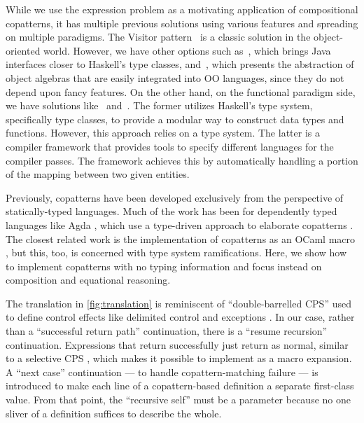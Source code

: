 While we use the expression problem as a motivating application of compositional copatterns, it has multiple previous solutions using various features and spreading on multiple paradigms.
The Visitor pattern~\cite{GangOfFour} is a classic solution in the object-oriented world.
However, we have other options such as~\cite{wehr_javagi_2011}, which brings Java interfaces closer to Haskell's type classes, and~\cite{hutchison_extensibility_2012}, which presents the abstraction of object algebras that are easily integrated into OO languages, since they do not depend upon fancy features.
On the other hand, on the functional paradigm side, we have solutions like~\cite{swierstra_data_2008} and~\cite{keep_nanopass_2013}.
The former utilizes Haskell's type system, specifically type classes, to provide a modular way to construct data types and functions.
However, this approach relies on a type system.
The latter is a compiler framework that provides tools to specify different languages for the compiler passes. The framework achieves this by automatically handling a portion of the mapping between two given entities.

Previously, copatterns have been developed exclusively from the perspective of statically-typed languages.
Much of the work has been for dependently typed languages like Agda \cite{ElaboratingDependentCopatterns}, which use a type-driven approach to elaborate copatterns \cite{UnnestingCopatterns,ThibodeauMasters}.
The closest related work is the implementation of copatterns as an OCaml macro \cite{LaforgueR17}, but this, too, is concerned with type system ramifications.
Here, we show how to implement copatterns with no typing information and focus instead on composition and equational reasoning.

The translation in \cref{fig:translation} is reminiscent of ``double-barrelled CPS'' \cite{DoubleBarrelCPS} used to define control effects like delimited control \cite{AbstractingControl} and exceptions \cite{KimYiDanvy98}.
In our case, rather than a ``successful return path'' continuation, there is a ``resume recursion'' continuation.
Expressions that return successfully just return as normal, similar to a selective CPS \cite{SelectiveCPS}, which makes it possible to implement as a macro expansion.
A ``next case'' continuation --- to handle copattern-matching failure --- is introduced to make each line of a copattern-based definition a separate first-class value.
From that point, the ``recursive self'' must be a parameter because no one sliver of a definition suffices to describe the whole.

